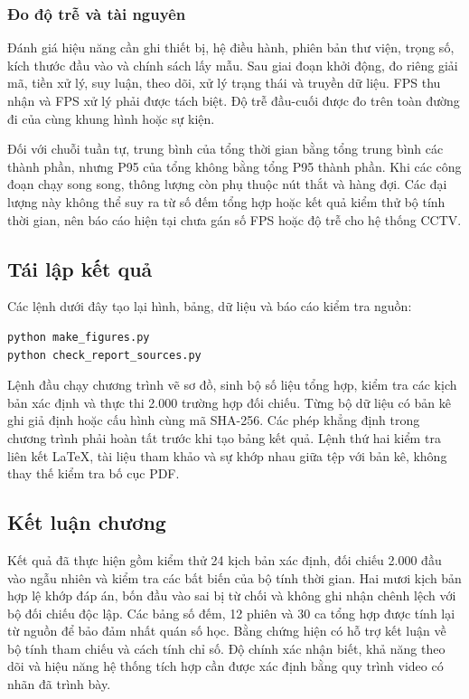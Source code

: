 \subsubsection{Đo độ trễ và tài nguyên}
Đánh giá hiệu năng cần ghi thiết bị, hệ điều hành, phiên bản thư viện, trọng số, kích thước đầu vào và chính sách lấy mẫu. Sau giai đoạn khởi động, đo riêng giải mã, tiền xử lý, suy luận, theo dõi, xử lý trạng thái và truyền dữ liệu. FPS thu nhận và FPS xử lý phải được tách biệt. Độ trễ đầu-cuối được đo trên toàn đường đi của cùng khung hình hoặc sự kiện.

Đối với chuỗi tuần tự, trung bình của tổng thời gian bằng tổng trung bình các thành phần, nhưng P95 của tổng không bằng tổng P95 thành phần. Khi các công đoạn chạy song song, thông lượng còn phụ thuộc nút thắt và hàng đợi. Các đại lượng này không thể suy ra từ số đếm tổng hợp hoặc kết quả kiểm thử bộ tính thời gian, nên báo cáo hiện tại chưa gán số FPS hoặc độ trễ cho hệ thống CCTV.

\subsection{Tái lập kết quả}
Các lệnh dưới đây tạo lại hình, bảng, dữ liệu và báo cáo kiểm tra nguồn:
\begin{Verbatim}[fontsize=\small,breaklines=true]
python make_figures.py
python check_report_sources.py
\end{Verbatim}
Lệnh đầu chạy chương trình vẽ sơ đồ, sinh bộ số liệu tổng hợp, kiểm tra các kịch bản xác định và thực thi 2.000 trường hợp đối chiếu. Từng bộ dữ liệu có bản kê ghi giả định hoặc cấu hình cùng mã SHA-256. Các phép khẳng định trong chương trình phải hoàn tất trước khi tạo bảng kết quả. Lệnh thứ hai kiểm tra liên kết LaTeX, tài liệu tham khảo và sự khớp nhau giữa tệp với bản kê, không thay thế kiểm tra bố cục PDF.

\subsection{Kết luận chương}
Kết quả đã thực hiện gồm kiểm thử 24 kịch bản xác định, đối chiếu 2.000 đầu vào ngẫu nhiên và kiểm tra các bất biến của bộ tính thời gian. Hai mươi kịch bản hợp lệ khớp đáp án, bốn đầu vào sai bị từ chối và không ghi nhận chênh lệch với bộ đối chiếu độc lập. Các bảng số đếm, 12 phiên và 30 ca tổng hợp được tính lại từ nguồn để bảo đảm nhất quán số học. Bằng chứng hiện có hỗ trợ kết luận về bộ tính tham chiếu và cách tính chỉ số. Độ chính xác nhận biết, khả năng theo dõi và hiệu năng hệ thống tích hợp cần được xác định bằng quy trình video có nhãn đã trình bày.

